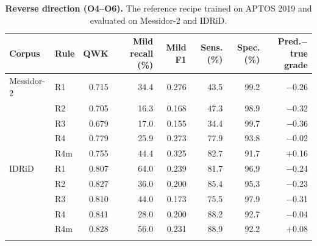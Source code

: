 \begin{table}[h]
\caption{\textbf{Reverse direction (O4--O6).} The reference recipe trained on APTOS 2019 and evaluated on Messidor-2 and IDRiD.}\label{tab:s7}
\centering\scriptsize
\begin{tabular}{@{}llrrrrrr@{}}
\toprule
Corpus & Rule & QWK & Mild recall (\%) & Mild F1 & Sens. (\%) & Spec. (\%) & Pred.$-$true grade \\
\midrule
Messidor-2 & R1 & 0.715 & 34.4 & 0.276 & 43.5 & 99.2 & $-$0.26 \\
 & R2 & 0.705 & 16.3 & 0.168 & 47.3 & 98.9 & $-$0.32 \\
 & R3 & 0.679 & 17.0 & 0.155 & 34.4 & 99.7 & $-$0.36 \\
 & R4 & 0.779 & 25.9 & 0.273 & 77.9 & 93.8 & $-$0.02 \\
 & R4m & 0.755 & 44.4 & 0.325 & 82.7 & 91.7 & +0.16 \\
\addlinespace
IDRiD & R1 & 0.807 & 64.0 & 0.239 & 81.7 & 96.9 & $-$0.24 \\
 & R2 & 0.827 & 36.0 & 0.200 & 85.4 & 95.3 & $-$0.23 \\
 & R3 & 0.810 & 44.0 & 0.173 & 75.5 & 97.9 & $-$0.31 \\
 & R4 & 0.841 & 28.0 & 0.200 & 88.2 & 92.7 & $-$0.04 \\
 & R4m & 0.828 & 56.0 & 0.231 & 88.9 & 92.2 & +0.08 \\
\addlinespace
\bottomrule
\end{tabular}
\end{table}
